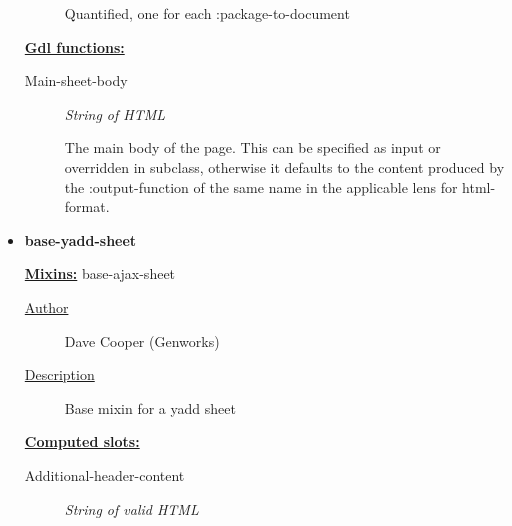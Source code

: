 \documentclass [11pt]{book}
\begin{document}
\begin{itemize}
\begin{description}
 Quantified, one for each :package-to-document




\end{description}






\textbf{
\underline{Gdl functions:}}

\begin{description}

\item [Main-sheet-body]
\emph{String of HTML}

 The main body of the page.
This can be specified as input or overridden in subclass, otherwise it defaults
to the content produced by the :output-function of the same name
in the applicable lens for  html-format.




\end{description}







\item {}
\label{prim:base-yadd-sheet}
\textbf{base-yadd-sheet}


\textbf{
\underline{Mixins:}} base-ajax-sheet





\begin{description}

\item [
\underline{Author}]


Dave Cooper (Genworks)



\item [
\underline{Description}]


Base mixin for a yadd sheet



\end{description}








\textbf{
\underline{Computed slots:}}

\begin{description}

\item [Additional-header-content]
\emph{String of valid HTML}


\end{description}
\end{itemize}
\end{document}
